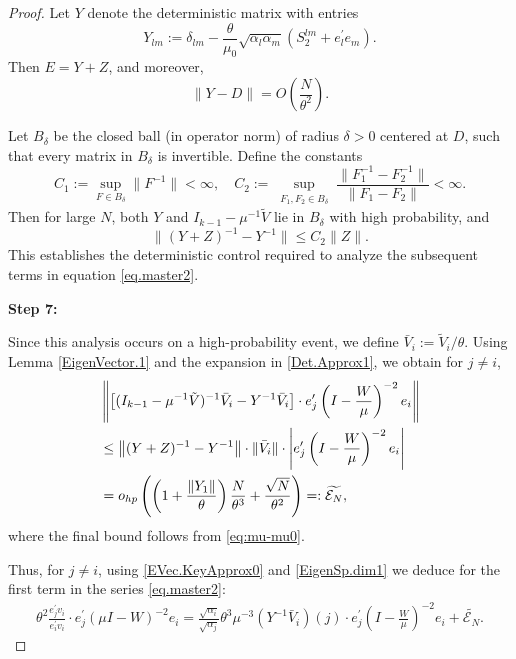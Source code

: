 \documentclass[10pt,a4paper]{amsart}
\begin{document}
\begin{proof}
Let $Y$ denote the deterministic matrix with entries
\begin{equation}\label{eq:Ymatrix}
Y_{lm} := \delta_{lm} - \frac{\theta}{\mu_0} \sqrt{\alpha_l \alpha_m} (S_2^{lm} + e_l^\prime e_m).
\end{equation}
Then $E = Y + Z$, and moreover,
\begin{equation}\label{Det.Approx2}
\|Y - D\| = O\left( \frac{N}{\theta^2} \right).
\end{equation}

Let $B_\delta$ be the closed ball (in operator norm) of radius $\delta > 0$ centered at $D$, such that every matrix in $B_\delta$ is invertible. Define the constants
\begin{equation}\label{InverseBound}
C_1 := \sup_{F \in B_\delta} \|F^{-1}\| < \infty, \quad
C_2 := \sup_{\substack{F_1, F_2 \in B_\delta}} \frac{\|F_1^{-1} - F_2^{-1}\|}{\|F_1 - F_2\|} < \infty.
\end{equation}
Then for large $N$, both $Y$ and $I_{k-1} - \mu^{-1}\tilde V$ lie in $B_\delta$ with high probability, and
\begin{equation}
\| (Y + Z)^{-1} - Y^{-1} \| \le C_2 \|Z\|.
\end{equation}
This establishes the deterministic control required to analyze the subsequent terms in equation \eqref{eq.master2}.




\textbf{Step 7:}

Since this analysis occurs on a high-probability event, we define \( \bar V_i := \tilde V_i/\theta \). Using Lemma \ref{EigenVector.1} and the expansion in \eqref{Det.Approx1}, we obtain for \( j \ne i \),
\begin{align}
& \left\| \left[ (I_{k-1} - \mu^{-1} \tilde V)^{-1} \bar V_i - Y^{-1} \bar V_i \right] \cdot e_j^\prime \left(I - \frac{W}{\mu}\right)^{-2} e_i \right\| \notag \\
& \le \left\| (Y + Z)^{-1} - Y^{-1} \right\| \cdot \|\bar V_i\| \cdot \left| e_j^\prime \left(I - \frac{W}{\mu} \right)^{-2} e_i \right| \notag \\
& = o_{hp} \left( \left(1 + \frac{\|Y_1\|}{\theta} \right) \frac{N}{\theta^3} + \frac{\sqrt{N}}{\theta^2} \right)=:\widetilde{\mathcal{E}_N}, \label{EVec.KeyApprox0}
\end{align}
where the final bound follows from \eqref{eq:mu-mu0}.

Thus, for \( j \ne i \), using \eqref{EVec.KeyApprox0} and \eqref{EigenSp.dim1} we deduce for the first term in the series \eqref{eq.master2}:
\begin{align}
\theta^2 \frac{e_j^\prime v_i}{e_i^\prime v_i} \cdot e_j^\prime (\mu I - W)^{-2} e_i 
= \frac{\sqrt{\alpha_i}}{\sqrt{\alpha_j}}\theta^3 \mu^{-3} (Y^{-1} \bar V_i)(j) \cdot e_j^\prime \left(I - \frac{W}{\mu}\right)^{-2} e_i + \widetilde{\mathcal{E}_N}. \label{EVec.KeyApprox1}
\end{align}


\end{proof}
\end{document}
